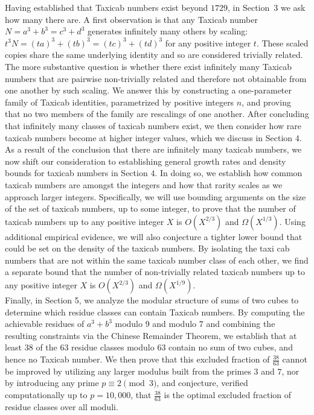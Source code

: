 \documentclass[12pt]{amsart}
\theoremstyle{definition}
\theoremstyle{remark}
\begin{document}
Having established that Taxicab numbers exist beyond $1729$, in
Section~$3$ we ask how many there are. A first observation is 
that any Taxicab number $N = a^3 + b^3 = c^3 + d^3$ generates infinitely 
many others by scaling: $t^3 N = (ta)^3 + (tb)^3 = (tc)^3 + (td)^3$ for 
any positive integer $t$. These scaled copies share the same underlying 
identity and so are considered trivially related. The more substantive 
question is whether there exist infinitely many Taxicab numbers that are 
pairwise non-trivially related and therefore not obtainable from one another 
by such scaling. We answer this by constructing a 
one-parameter family of Taxicab identities, parametrized by positive 
integers $n$, and proving that no two members of the family are rescalings 
of one another. After concluding that infinitely many classes of taxicab numbers exist, we then consider how rare taxicab numbers become at higher integer values, which we discuss in Section $4$. \\

As a result of the conclusion that there are infinitely many taxicab numbers, we now shift our consideration to establishing general growth rates and density bounds for taxicab numbers in Section $4$. In doing so, we establish how common taxicab numbers are amongst the integers and how that rarity scales as we approach larger integers. Specifically, we will use bounding arguments on the size of the set of taxicab numbers, up to some integer, to prove that the number of taxicab numbers up to any positive integer $X$ is $O(X^{2/3})$ and $\Omega(X^{1/3})$. Using additional empirical evidence, we will also conjecture a tighter lower bound that could be set on the density of the taxicab numbers. By isolating the taxi cab numbers that are not within the same taxicab number class of each other, we find a separate bound that the number of non-trivially related taxicab numbers up to any positive integer $X$ is $O(X^{2/3})$ and $\Omega(X^{1/9})$.\\

Finally, in Section 5, we analyze the modular structure of sums of two cubes to determine which residue classes can contain Taxicab numbers. By computing the achievable residues of $a^3 + b^3$ modulo $9$ and modulo $7$ and combining the resulting constraints via the Chinese Remainder Theorem, we establish that at least $38$ of the $63$ residue classes modulo $63$ contain no sum of two cubes, and hence no Taxicab number. We then prove that this excluded fraction of $\frac{38}{63}$ cannot be improved by utilizing any larger modulus built from the primes $3$ and $7$, nor by introducing any prime $p \equiv 2 \pmod{3}$, and conjecture, verified computationally up to $p = 10{,}000$, that $\frac{38}{63}$ is the optimal excluded fraction of residue classes over all moduli.
\end{document}
